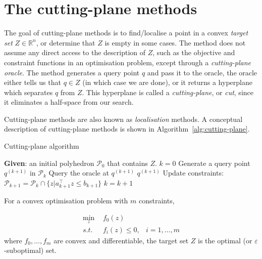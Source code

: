 \section{The cutting-plane methods}
\label{sec:cuttingplane}

The goal of cutting-plane methods is to find/localise a point in a convex \textit{target set} $Z \in \mathbb{R}^n$,
or determine that $Z$ is empty in some cases. 
The method does not assume any direct access to the description of $Z$,
such as the objective and constraint functions in an optimisation problem, except through a \textit{cutting-plane oracle}.
The method generates a query point $q$ and pass it to the oracle, 
the oracle either tells us that $q \in Z$ (in which case we are done), or it returns a hyperplane which separates $q$ from $Z$.
This hyperplane is called a \textit{cutting-plane}, or \textit{cut}, since it eliminates a half-space from our search.

Cutting-plane methods are also known as \textit{localisation} methods. 
A conceptual description of cutting-plane methods is shown in Algorithm~\ref{alg:cutting-plane}.


\begin{algorithm}[htbp]
\caption{Cutting-plane algorithm}
\label{alg:cutting-plane}
\begin{algorithmic}[1]
\STATE \textbf{Given}: an initial polyhedron $\mathcal{P}_0$ that contains $Z$.
\STATE $k = 0$
\REPEAT
    \STATE Generate a query point $q^{(k+1)}$ in $\mathcal{P}_k$
    \STATE Query the oracle at $q^{(k+1)}$
        \RETURN $q^{(k+1)}$
        \STATE Update constraints: $\mathcal{P}_{k+1} = \mathcal{P}_k \cap \{z | a_{k+1}^\top z \le b_{k+1} \}$
    \ENDIF
    \STATE $k = k + 1$
\end{algorithmic}
\end{algorithm}


\noindent
For a convex optimisation problem with $m$ constraints,

\begin{equation}
\label{eq:cvxprob}
\begin{aligned}
\min_{z} ~& f_0(z)        & \\
s.t.~~   ~& f_i(z) \le 0, & i = 1, \dots, m
\end{aligned} 
\end{equation}
where $f_0, \dots, f_m$ are convex and differentiable, the target set $Z$ is the optimal (or $\varepsilon$-suboptimal) set.


